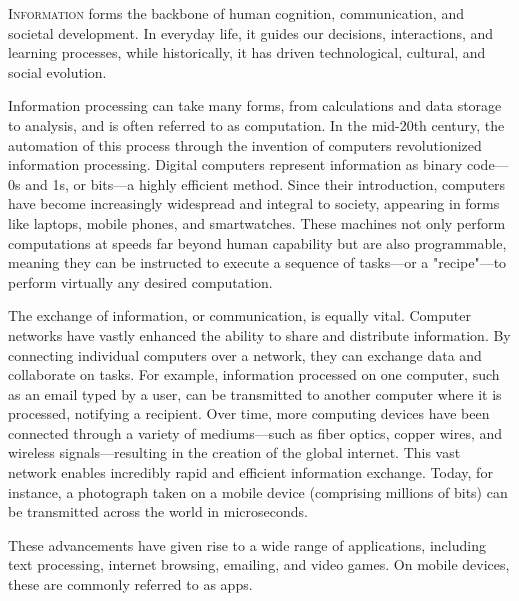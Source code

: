 \lettrine{I}{nformation} forms the backbone of human cognition, communication, and societal development.
In everyday life, it guides our decisions, interactions, and learning processes, while historically, it has driven technological, cultural, and social evolution.

Information processing can take many forms, from calculations and data storage to analysis, and is often referred to as computation.
In the mid-20th century, the automation of this process through the invention of computers revolutionized information processing.
Digital computers represent information as binary code—0s and 1s, or bits—a highly efficient method.
Since their introduction, computers have become increasingly widespread and integral to society, appearing in forms like laptops, mobile phones, and smartwatches.
These machines not only perform computations at speeds far beyond human capability but are also programmable, meaning they can be instructed to execute a sequence of tasks—or a "recipe"—to perform virtually any desired computation.

The exchange of information, or communication, is equally vital.
Computer networks have vastly enhanced the ability to share and distribute information.
By connecting individual computers over a network, they can exchange data and collaborate on tasks.
For example, information processed on one computer, such as an email typed by a user, can be transmitted to another computer where it is processed, notifying a recipient.
Over time, more computing devices have been connected through a variety of mediums—such as fiber optics, copper wires, and wireless signals—resulting in the creation of the global internet.
This vast network enables incredibly rapid and efficient information exchange.
Today, for instance, a photograph taken on a mobile device (comprising millions of bits) can be transmitted across the world in microseconds.

These advancements have given rise to a wide range of applications, including text processing, internet browsing, emailing, and video games.
On mobile devices, these are commonly referred to as apps.


